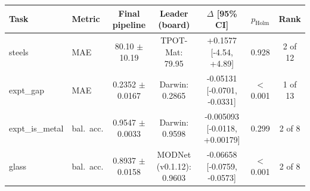 \begin{tabular}{llccccc}
\toprule
Task & Metric & Final pipeline & Leader (board) & $\Delta$ [95\% CI] & $p_\mathrm{Holm}$ & Rank \\
\midrule
steels & MAE & 80.10 $\pm$ 10.19 & TPOT-Mat: 79.95 & +0.1577 [-4.54, +4.89] & 0.928 & 2 of 12 \\
expt\_gap & MAE & 0.2352 $\pm$ 0.0167 & Darwin: 0.2865 & -0.05131 [-0.0701, -0.0331] & $<$0.001 & 1 of 13 \\
expt\_is\_metal & bal.\ acc. & 0.9547 $\pm$ 0.0033 & Darwin: 0.9598 & -0.005093 [-0.0118, +0.00179] & 0.299 & 2 of 8 \\
glass & bal.\ acc. & 0.8937 $\pm$ 0.0158 & MODNet (v0.1.12): 0.9603 & -0.06658 [-0.0759, -0.0573] & $<$0.001 & 2 of 8 \\
\bottomrule
\end{tabular}
